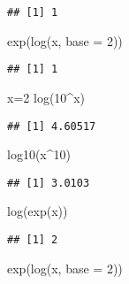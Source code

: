 \documentclass[
]{article}
\newenvironment{Shaded}{\begin{snugshade}}{\end{snugshade}}
\newcommand{\AttributeTok}[1]{\textcolor[rgb]{0.77,0.63,0.00}{#1}}
\newcommand{\DecValTok}[1]{\textcolor[rgb]{0.00,0.00,0.81}{#1}}
\newcommand{\FunctionTok}[1]{\textcolor[rgb]{0.00,0.00,0.00}{#1}}
\newcommand{\NormalTok}[1]{#1}
\newcommand{\OtherTok}[1]{\textcolor[rgb]{0.56,0.35,0.01}{#1}}
\newcommand{\SpecialCharTok}[1]{\textcolor[rgb]{0.00,0.00,0.00}{#1}}
\begin{document}
\begin{verbatim}
## [1] 1
\end{verbatim}

\begin{Shaded}
\begin{Highlighting}[]
\FunctionTok{exp}\NormalTok{(}\FunctionTok{log}\NormalTok{(x, }\AttributeTok{base =} \DecValTok{2}\NormalTok{))}
\end{Highlighting}
\end{Shaded}

\begin{verbatim}
## [1] 1
\end{verbatim}

\begin{Shaded}
\begin{Highlighting}[]
\NormalTok{x}\OtherTok{=}\DecValTok{2}
\FunctionTok{log}\NormalTok{(}\DecValTok{10}\SpecialCharTok{\^{}}\NormalTok{x)}
\end{Highlighting}
\end{Shaded}

\begin{verbatim}
## [1] 4.60517
\end{verbatim}

\begin{Shaded}
\begin{Highlighting}[]
\FunctionTok{log10}\NormalTok{(x}\SpecialCharTok{\^{}}\DecValTok{10}\NormalTok{)}
\end{Highlighting}
\end{Shaded}

\begin{verbatim}
## [1] 3.0103
\end{verbatim}

\begin{Shaded}
\begin{Highlighting}[]
\FunctionTok{log}\NormalTok{(}\FunctionTok{exp}\NormalTok{(x))}
\end{Highlighting}
\end{Shaded}

\begin{verbatim}
## [1] 2
\end{verbatim}

\begin{Shaded}
\begin{Highlighting}[]
\FunctionTok{exp}\NormalTok{(}\FunctionTok{log}\NormalTok{(x, }\AttributeTok{base =} \DecValTok{2}\NormalTok{))}
\end{Highlighting}
\end{Shaded}
\end{document}
